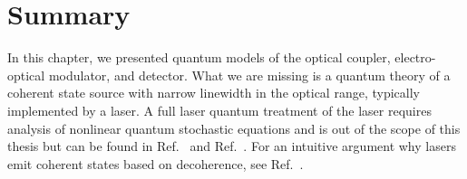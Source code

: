\section*{Summary}

In this chapter, we presented quantum models of the optical coupler, electro-optical modulator, and detector.
What we are missing is a quantum theory of a coherent state source with narrow linewidth in the optical range, typically implemented by a laser.
A full laser quantum treatment of the laser requires analysis of nonlinear quantum stochastic equations and is out of the scope of this thesis but can be found in Ref.~\cite[p.~900]{Mandel1995} and Ref.~\cite{Haken2012,Gardiner2000}.
For an intuitive argument why lasers emit coherent states based on decoherence, see Ref.~\cite{Gea1998}.


